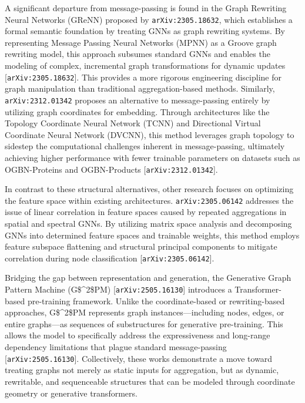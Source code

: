 \documentclass[11pt]{article}
\begin{document}
A significant departure from message-passing is found in the Graph Rewriting Neural Networks (GReNN) proposed by \texttt{arXiv:2305.18632}, which establishes a formal semantic foundation by treating GNNs as graph rewriting systems. By representing Message Passing Neural Networks (MPNN) as a Groove graph rewriting model, this approach subsumes standard GNNs and enables the modeling of complex, incremental graph transformations for dynamic updates [\texttt{arXiv:2305.18632}]. This provides a more rigorous engineering discipline for graph manipulation than traditional aggregation-based methods. Similarly, \texttt{arXiv:2312.01342} proposes an alternative to message-passing entirely by utilizing graph coordinates for embedding. Through architectures like the Topology Coordinate Neural Network (TCNN) and Directional Virtual Coordinate Neural Network (DVCNN), this method leverages graph topology to sidestep the computational challenges inherent in message-passing, ultimately achieving higher performance with fewer trainable parameters on datasets such as OGBN-Proteins and OGBN-Products [\texttt{arXiv:2312.01342}].

In contrast to these structural alternatives, other research focuses on optimizing the feature space within existing architectures. \texttt{arXiv:2305.06142} addresses the issue of linear correlation in feature spaces caused by repeated aggregations in spatial and spectral GNNs. By utilizing matrix space analysis and decomposing GNNs into determined feature spaces and trainable weights, this method employs feature subspace flattening and structural principal components to mitigate correlation during node classification [\texttt{arXiv:2305.06142}].

Bridging the gap between representation and generation, the Generative Graph Pattern Machine (G\$\textasciicircum{}2\$PM) [\texttt{arXiv:2505.16130}] introduces a Transformer-based pre-training framework. Unlike the coordinate-based or rewriting-based approaches, G\$\textasciicircum{}2\$PM represents graph instances—including nodes, edges, or entire graphs—as sequences of substructures for generative pre-training. This allows the model to specifically address the expressiveness and long-range dependency limitations that plague standard message-passing [\texttt{arXiv:2505.16130}]. Collectively, these works demonstrate a move toward treating graphs not merely as static inputs for aggregation, but as dynamic, rewritable, and sequenceable structures that can be modeled through coordinate geometry or generative transformers.
\end{document}
